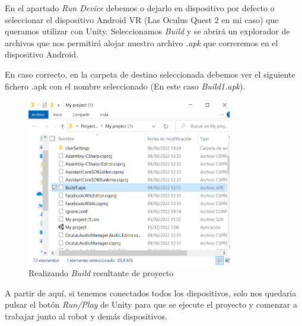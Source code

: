 En el apartado \textit{Run Device} debemos o dejarlo en dispositivo por defecto o seleccionar el dispositivo Android VR\cite{VR} (Las Oculus Quest 2 en mi caso) que queramos utilizar con Unity.
Seleccionamos \textit{Build} y se abrirá un explorador de archivos que nos permitirá alojar nuestro archivo \textit{.apk} que correremos en el dispositivo Android.

\newpage
En caso correcto, en la carpeta de destino seleccionada debemos ver el siguiente fichero .apk con el nombre seleccionado (En este caso \textit{Build1.apk}).
   \begin{figure}[h]
\centering
\label{Realizando la \textit{Build} resultante de proyecto}
\includegraphics[width=0.8\textwidth]{img/inst4.PNG}
\caption{Realizando \textit{Build} resultante de proyecto}
\end{figure}

A partir de aquí, si tenemos conectados todos los dispositivos, solo nos quedaría pulsar el botón \textit{Run/Play} de Unity para que se ejecute el proyecto y comenzar a trabajar junto al robot y demás dispositivos.

